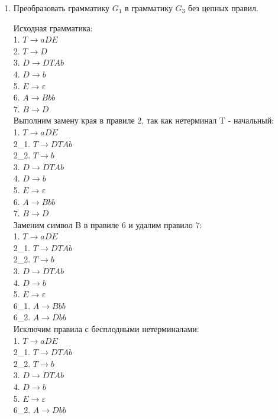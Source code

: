 \documentclass[a4paper,14pt]{extarticle}
\begin{document}
\begin{enumerate}[1.]
\item Преобразовать грамматику $G_1$ в грамматику $G_3$ без цепных правил.

Исходная грамматика:\\
1. $T \rightarrow aDE$\\
2. $T \rightarrow D$\\
3. $D \rightarrow DTAb$\\
4. $D \rightarrow b$\\
5. $E \rightarrow \varepsilon$\\
6. $A \rightarrow Bbb$\\
7. $B \rightarrow D$\\

Выполним замену края в правиле 2, так как нетерминал T - начальный:\\
1. $T \rightarrow aDE$\\
2\_1. $T \rightarrow DTAb$\\
2\_2. $T \rightarrow b$\\
3. $D \rightarrow DTAb$\\
4. $D \rightarrow b$\\
5. $E \rightarrow \varepsilon$\\
6. $A \rightarrow Bbb$\\
7. $B \rightarrow D$\\

Заменим символ B в правиле 6 и удалим правило 7:\\
1. $T \rightarrow aDE$\\
2\_1. $T \rightarrow DTAb$\\
2\_2. $T \rightarrow b$\\
3. $D \rightarrow DTAb$\\
4. $D \rightarrow b$\\
5. $E \rightarrow \varepsilon$\\
6\_1. $A \rightarrow Bbb$\\
6\_2. $A \rightarrow Dbb$\\

Исключим правила с бесплодными нетерминалами:\\
1. $T \rightarrow aDE$\\
2\_1. $T \rightarrow DTAb$\\
2\_2. $T \rightarrow b$\\
3. $D \rightarrow DTAb$\\
4. $D \rightarrow b$\\
5. $E \rightarrow \varepsilon$\\
6\_2. $A \rightarrow Dbb$\\


\end{enumerate}
\end{document}
